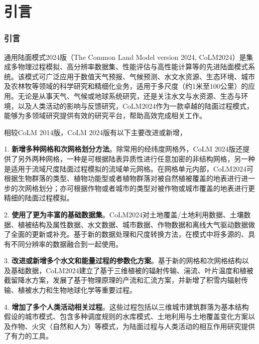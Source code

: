 \part{引言}
\section{引言}


通用陆面模式2024版（The Common Land Model version 2024, CoLM2024）是集成多物理过程模拟、高分辨率数据集、性能评估与高性能计算等的先进陆面模式系统。该模式可广泛应用于数值天气预报、气候预测、水文水资源、生态环境、城市及农林牧等领域的科学研究和精细化业务，适用于多尺度（约1米至100公里）的应用。无论是从事天气、气候或地球系统研究，还是关注水文与水资源、生态与环境，以及人类活动的影响与反馈研究，CoLM2024作为一款卓越的陆面过程模式，能够为多领域研究提供有效的研究平台，帮助高效完成相关工作。

相较CoLM 2014版，CoLM 2024版有以下主要改进或新增，

1. \textbf{新增多种网格和次网格划分方法}。除常用的经纬度网格外，CoLM 2024版还提供了另外两种网格，一种是可根据陆表异质性进行任意加密的非结构网格，另一种是适用于流域尺度陆面过程模拟的流域单元网格。在网格单元内部，CoLM2024可根据生物群落的类型、植物功能型或者植物群落对被自然植被覆盖的地表进行进一步的次网格划分；亦可根据作物或者城市的类型对被作物或城市覆盖的地表进行更精细的陆面过程模拟。

2. \textbf{使用了更为丰富的基础数据集}。CoLM2024对土地覆盖/土地利用数据、土壤数据、植被结构及属性数据、水文数据、城市数据、作物数据和离线大气驱动数据做了全面的更新或补充。基于新的数据处理和尺度转换方法，在模式中将多源的、具有不同分辨率的数据融合到一起使用。

3. \textbf{改进或新增多个水文和能量过程的参数化方案}。基于新的网格和次网格结构以及基础数据，CoLM2024建立了基于三维植被的辐射传输、湍流、叶片温度和植被截留降水方案，发展了基于物理原理的产流和汇流方案，并新增了积雪内辐射传输、植被水力和生物地球化学等重要过程。

4. \textbf{增加了多个人类活动相关过程}。这些过程包括以三维城市建筑群落为基本结构假设的城市模式、包含多种调度规则的水库模式、土地利用与土地覆盖变化方案以及作物、火灾（自然和人为）等模式，为陆面过程与人类活动的相互作用研究提供了有力的工具。


